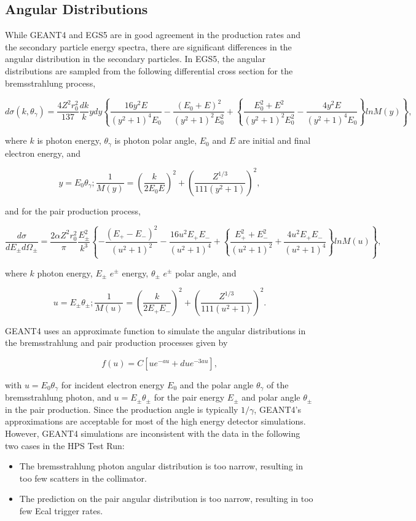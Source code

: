 \subsection*{Angular Distributions}

While GEANT4 and EGS5 are in good agreement in the production rates and the secondary particle
energy spectra, there are significant differences in the angular distribution in the secondary
particles. In EGS5, the angular distributions are sampled from the following differential
cross section for the bremsstrahlung process, \cite{koch}

$$d\sigma(k,\theta_\gamma) = {\frac{4Z^2r_0^2} {137}} {\frac{dk} {k}} ydy\left\{{\frac{16y^2E} 
{(y^2+1)^4E_0}}
 -{\frac{(E_0+E)^2} {(y^2+1)^2E_0^2}}+\left\{{\frac{E_0^2+E^2} {(y^2+1)^2E_0^2}} -
 {\frac{4y^2E} {(y^2+1)^4E_0}}\right\} lnM(y) \right\}, $$

\noindent
where $k$ is photon energy, $\theta_\gamma$ is photon polar angle, $E_0$ and $E$ are initial and final 
electron energy, and

$$y=E_0\theta_\gamma; {\frac{1} {M(y)}} = \left({\frac{k} {2E_0E}}\right)^2 + \left({\frac{Z^{1/3}} {111(y^2+1)}}\right)^2, $$

\noindent
and for the pair production process, \cite{motz}

$${\frac{d\sigma} {dE_\pm d\Omega_\pm}} = {\frac{2\alpha Z^2r_0^2} {\pi}} {\frac{E_\pm^2} {k^3}}
\left\{-{\frac{(E_+-E_-)^2} {(u^2+1)^2}}-{\frac{16u^2E_+E_-} {(u^2+1)^4}} + \left\{ {\frac{E_+^2+E_-^2} 
{(u^2+1)^2}} + {\frac{4u^2E_+E_-} {(u^2+1)^4}} \right\} lnM(u)\right\},$$

\noindent
where $k$ photon energy, $E_\pm$ $e^{\pm}$ energy, $\theta_\pm$ $e^{\pm}$ polar angle, and

$$u=E_\pm\theta_\pm; {\frac{1} {M(u)}} = \left({\frac{k} {2E_+E_-}}\right)^2+\left({\frac{Z^{1/3}} {111(u^2+1)}}\right)^2.$$

\noindent
GEANT4 uses an approximate function to simulate the angular distributions in the 
bremsstrahlung and pair production processes given by

$$ f(u) = C [ue^{-au} + d u e^{-3au}], $$

\noindent
with $u=E_0\theta_\gamma$ for incident electron energy $E_0$ and the polar angle 
$\theta_\gamma$ of the bremsstrahlung photon, and $u=E_{\pm}\theta_{\pm}$ for the pair 
energy $E_\pm$ and polar angle $\theta_\pm$ in the pair production. Since the production angle
is typically $1/\gamma$, GEANT4's approximations are acceptable
for most of the high energy detector simulations. However, GEANT4
simulations are inconsistent with the data in the following two cases in the HPS Test Run:
\begin{itemize}
\item The bremsstrahlung photon angular distribution is too narrow, 
resulting in too few scatters in the collimator.
\item The prediction on the pair angular distribution is too narrow, resulting in 
too few Ecal trigger rates.
\end{itemize}

